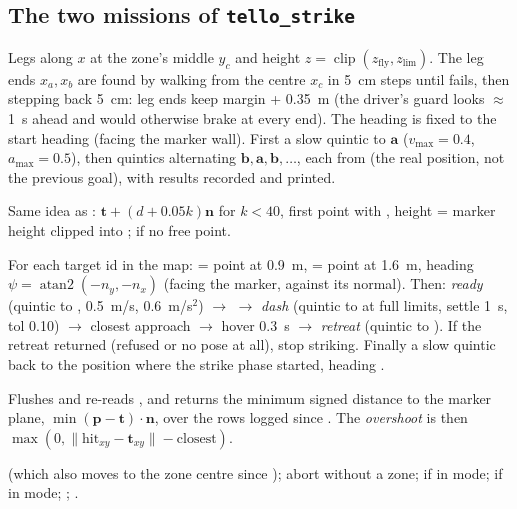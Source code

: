 \subsection{The two missions of \texorpdfstring{\texttt{tello\_strike}}{tello\_strike}}

Legs along $x$ at the zone's middle $y_c$ and height $z = \operatorname{clip}(z_{\text{fly}}, z_{\text{lim}})$.
The leg ends $x_a, x_b$ are found by walking from the centre $x_c$ in 5~cm steps until 
fails, then stepping back 5~cm: leg ends keep margin + 0.35~m (the driver's guard looks $\approx$1~s ahead and
would otherwise brake at every end). The heading is fixed to the start heading  (facing the marker
wall). First a slow quintic to $\mathbf a$ ($v_{\max}=0.4$, $a_{\max}=0.5$), then  quintics
alternating $\mathbf b, \mathbf a, \mathbf b, \dots$, each from  (the real position, not the
previous goal), with results recorded and printed.

Same idea as : $\mathbf t + (d + 0.05k)\mathbf n$ for $k < 40$, first point with
, height = marker height clipped into ;  if no free point.

For each target id in the map:  = point at 0.9~m,  = point at 1.6~m, heading
$\psi = \operatorname{atan2}(-n_y, -n_x)$ (facing the marker, against its normal). Then:
\emph{ready} (quintic to , 0.5~m/s, 0.6~m/s$^2$) $\rightarrow$  $\rightarrow$
\emph{dash} (quintic to  at full limits, settle 1~s, tol 0.10) $\rightarrow$ closest approach
$\rightarrow$ hover 0.3~s $\rightarrow$ \emph{retreat} (quintic to ). If the retreat returned
 (refused or no pose at all), stop striking. Finally a slow quintic back to the position where the
strike phase started, heading .

Flushes and re-reads , and returns the minimum signed distance to the marker plane,
$\min (\mathbf p - \mathbf t)\cdot\mathbf n$, over the rows logged since . The \emph{overshoot} is then
$\max(0, \lVert \text{hit}_{xy} - \mathbf t_{xy}\rVert - \text{closest})$.

 (which also moves to the zone centre since ); abort without a
zone;  if in mode;  if in mode; ; .


